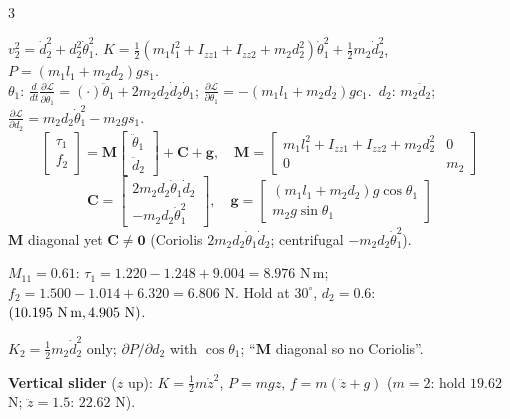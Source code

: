 \begin{multicols}{3}
\begin{deriv}
$v_2^2=\dot d_2^2+d_2^2\dot\theta_1^2$. $K=\tfrac12(m_1l_1^2{+}I_{zz1}{+}I_{zz2}{+}m_2d_2^2)\dot\theta_1^2+\tfrac12m_2\dot d_2^2$, $P=(m_1l_1{+}m_2d_2)gs_1$.\\
$\theta_1$: $\tfrac d{dt}\tfrac{\partial\mathcal L}{\partial\dot\theta_1}=(\cdot)\ddot\theta_1+2m_2d_2\dot d_2\dot\theta_1$; $\tfrac{\partial\mathcal L}{\partial\theta_1}=-(m_1l_1{+}m_2d_2)gc_1$.\ 
$d_2$: $m_2\ddot d_2$; $\tfrac{\partial\mathcal L}{\partial d_2}=m_2d_2\dot\theta_1^2-m_2gs_1$.
\[\begin{bmatrix}\tau_1\\f_2\end{bmatrix}=\mathbf M\begin{bmatrix}\ddot\theta_1\\\ddot d_2\end{bmatrix}+\mathbf C+\mathbf g,\quad\mathbf M=\begin{bmatrix}m_1l_1^2{+}I_{zz1}{+}I_{zz2}{+}m_2d_2^2&0\\0&m_2\end{bmatrix}\]
\[\mathbf C=\begin{bmatrix}2m_2d_2\dot\theta_1\dot d_2\\-m_2d_2\dot\theta_1^2\end{bmatrix},\quad\mathbf g=\begin{bmatrix}(m_1l_1{+}m_2d_2)g\cos\theta_1\\m_2g\sin\theta_1\end{bmatrix}\]
$\mathbf M$ diagonal yet $\mathbf C\ne\mathbf 0$ (Coriolis $2m_2d_2\dot\theta_1\dot d_2$; centrifugal $-m_2d_2\dot\theta_1^2$).
\end{deriv}
\begin{worked}[$m=(2,1)$, $l_1=0.3$, $I_{zz}=(0.05,0.02)$, $\theta_1=0.7$, $d_2=0.6$, $\dot\theta_1=1.3$, $\dot d_2=-0.8$, $\ddot\theta_1=2$, $\ddot d_2=1.5$]
$M_{11}=0.61$: $\tau_1=1.220-1.248+9.004=\boxed{8.976}$ N\,m; $f_2=1.500-1.014+6.320=\boxed{6.806}$ N. Hold at $30^\circ$, $d_2=0.6$: $(10.195\text{ N\,m},4.905\text{ N})$. \chk
\end{worked}
\begin{trap}
$K_2=\tfrac12m_2\dot d_2^2$ only; $\partial P/\partial d_2$ with $\cos\theta_1$; ``$\mathbf M$ diagonal so no Coriolis''.
\end{trap}
\textbf{Vertical slider} ($z$ up): $K=\tfrac12m\dot z^2$, $P=mgz$, $f=m(\ddot z+g)$ ($m=2$: hold $19.62$ N; $\ddot z=1.5$: $22.62$ N). \chk\\

\end{multicols}
